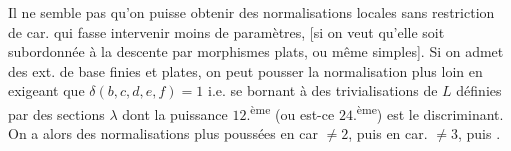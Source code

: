 Il ne semble pas qu'on puisse obtenir des normalisations locales sans  restriction de car. qui fasse intervenir moins de paramètres, [si on veut qu'elle soit subordonnée à la descente  par morphismes plats, ou même simples]. Si on admet des ext. de base finies et plates, on peut pousser la normalisation plus loin en exigeant que  $\delta(b,c,d,e,f)=1$ i.e.  se bornant à des trivialisations de $L$  définies par des sections $\lambda$ dont la puissance $12$.\textsuperscript{ème} (ou est-ce $24$.\textsuperscript{ème}) est  le discriminant. On a  alors des  normalisations plus poussées en car $\ne2$, puis en car. $\ne3$, puis .
